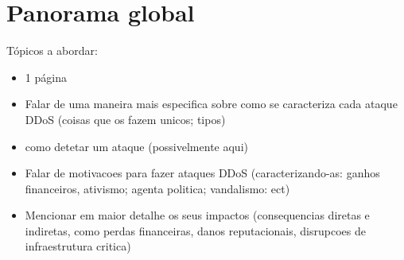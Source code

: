\section{Panorama global}
Tópicos a abordar:
\begin{itemize}
    \item 1 página
    \item Falar de uma maneira mais especifica sobre como se caracteriza cada ataque DDoS (coisas que os fazem unicos; tipos)
    \item como detetar um ataque (possivelmente aqui)
    \item Falar de motivacoes para fazer ataques DDoS (caracterizando-as: ganhos financeiros, ativismo; agenta politica; vandalismo: ect)
    \item Mencionar em maior detalhe os seus impactos (consequencias diretas e indiretas, como perdas financeiras, danos reputacionais, disrupcoes de infraestrutura critica)
\end{itemize}